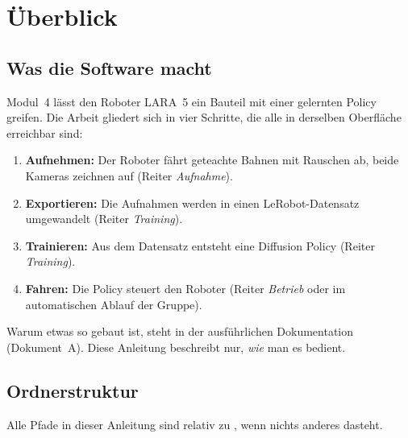 \chapter{Überblick}
\label{ch:ueberblick}

\section{Was die Software macht}

Modul~4 lässt den Roboter LARA~5 ein Bauteil mit einer gelernten Policy greifen. Die Arbeit
gliedert sich in vier Schritte, die alle in derselben Oberfläche erreichbar sind:

\begin{enumerate}
  \item \textbf{Aufnehmen:} Der Roboter fährt geteachte Bahnen mit Rauschen ab, beide Kameras
    zeichnen auf (Reiter \emph{Aufnahme}).
  \item \textbf{Exportieren:} Die Aufnahmen werden in einen LeRobot-Datensatz umgewandelt
    (Reiter \emph{Training}).
  \item \textbf{Trainieren:} Aus dem Datensatz entsteht eine Diffusion Policy
    (Reiter \emph{Training}).
  \item \textbf{Fahren:} Die Policy steuert den Roboter (Reiter \emph{Betrieb} oder im
    automatischen Ablauf der Gruppe).
\end{enumerate}

Warum etwas so gebaut ist, steht in der ausführlichen Dokumentation (Dokument~A). Diese
Anleitung beschreibt nur, \emph{wie} man es bedient.

\section{Ordnerstruktur}

Alle Pfade in dieser Anleitung sind relativ zu , wenn nichts
anderes dasteht.

